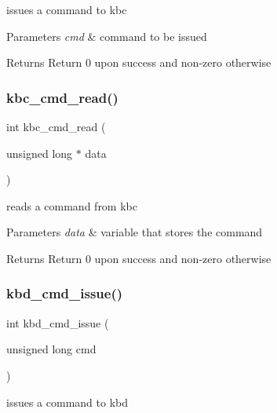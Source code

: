 issues a command to kbc 


\begin{DoxyParams}{Parameters}
{\em cmd} & command to be issued \\
\hline
\end{DoxyParams}
\begin{DoxyReturn}{Returns}
Return 0 upon success and non-\/zero otherwise 
\end{DoxyReturn}
\hypertarget{group__kbc_gad9d71d9448d7e3796e22f696863b7453}{}\label{group__kbc_gad9d71d9448d7e3796e22f696863b7453} 
\subsubsection{\texorpdfstring{kbc\+\_\+cmd\+\_\+read()}{kbc\_cmd\_read()}}
{\footnotesize\ttfamily int kbc\+\_\+cmd\+\_\+read (\begin{DoxyParamCaption}\item[{unsigned long $\ast$}]{data }\end{DoxyParamCaption})}



reads a command from kbc 


\begin{DoxyParams}{Parameters}
{\em data} & variable that stores the command \\
\hline
\end{DoxyParams}
\begin{DoxyReturn}{Returns}
Return 0 upon success and non-\/zero otherwise 
\end{DoxyReturn}
\hypertarget{group__kbc_gaa8b3453e895793f84cfc40e9cf04dd03}{}\label{group__kbc_gaa8b3453e895793f84cfc40e9cf04dd03} 
\subsubsection{\texorpdfstring{kbd\+\_\+cmd\+\_\+issue()}{kbd\_cmd\_issue()}}
{\footnotesize\ttfamily int kbd\+\_\+cmd\+\_\+issue (\begin{DoxyParamCaption}\item[{unsigned long}]{cmd }\end{DoxyParamCaption})}



issues a command to kbd 


